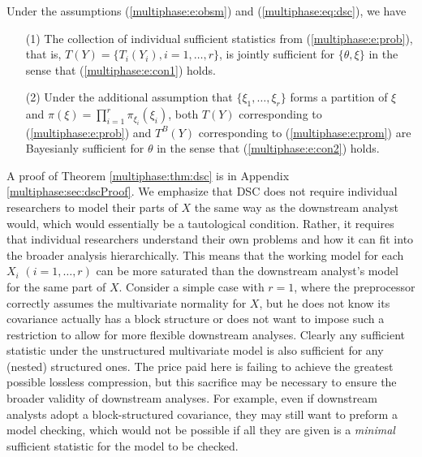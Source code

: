 \begin{theorem}
\label{multiphase:thm:dsc}
Under the assumptions (\ref{multiphase:e:obsm}) and (\ref{multiphase:eq:dsc}), we have 
\begin{itemize}
\item[(1)] The collection of individual sufficient statistics from (\ref{multiphase:e:prob}), that is, $T(Y)=\{T_i(Y_i), i=1,\ldots, r\}$,  is  jointly sufficient for $\{\theta,\xi\}$ in the sense  that  (\ref{multiphase:e:con1}) holds.
\item[(2)] Under the additional assumption that $\{\xi_1,\ldots, \xi_r\}$ forms a partition of $\xi$ and $\pi(\xi)=\prod_{i=1}^r \pi_{\xi_i}(\xi_i)$, both $T(Y)$ corresponding to (\ref{multiphase:e:prob}) and $T^B(Y)$ corresponding to  (\ref{multiphase:e:prom}) are Bayesianly sufficient  for $\theta$  in the sense that (\ref{multiphase:e:con2}) holds. 
\end{itemize}
\end{theorem}
A proof of Theorem \ref{multiphase:thm:dsc} is   in Appendix \ref{multiphase:sec:dscProof}.
%
We emphasize that DSC does not require individual researchers to model their parts of $X$ the same way as the downstream analyst would, which would essentially be a tautological condition. Rather, it requires that individual  researchers understand their own problems and how it can fit into the broader analysis hierarchically.%
This means that the working model for each $X_i$ $(i=1,\ldots, r)$ can be more saturated than the downstream analyst's model for the same part of $X$.
Consider a simple case with $r=1$, where  the preprocessor correctly assumes the  multivariate normality for $X$, but he does not know its covariance actually has a block structure or does not want to impose such a restriction to allow for more flexible downstream analyses. 
Clearly any sufficient statistic under the unstructured multivariate model is also sufficient for any (nested) structured ones.
The price paid here is failing to achieve the greatest possible lossless compression, but this sacrifice may be necessary to ensure the broader validity of downstream analyses.
For example, even if  downstream analysts adopt a block-structured covariance, they  may still want to preform a model checking, which would not be possible if all they are given is a \textit{minimal}  sufficient statistic for the model to be checked.    


